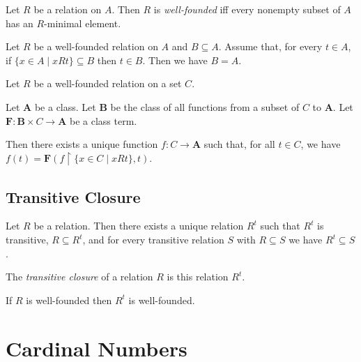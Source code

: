 \begin{definition}
    Let $R$ be a relation on $A$. Then $R$ is \emph{well-founded}
    iff every nonempty subset of $A$ has an $R$-minimal element.
\end{definition}

\begin{theorem}
    Let $R$ be a well-founded relation on $A$ and $B \subseteq A$.
    Assume that, for every $t \in A$, if $\{ x \in A \mid x Rt \} \subseteq B$
    then $t \in B$. Then we have $B = A$.
\end{theorem}

\begin{theorem}
    Let $R$ be a well-founded relation on a set $C$.

    Let $\mathbf{A}$ be a class. Let $\mathbf{B}$ be the class of all functions
    from a subset of $C$ to $\mathbf{A}$.
    Let $\mathbf{F} : \mathbf{B} \times C \rightarrow \mathbf{A}$ be a class term.

    Then there
    exists a unique function $f : C \rightarrow \mathbf{A}$ such that, for all $t \in C$,
    we have $f(t) = \mathbf{F}(f \restriction \{ x \in C \mid x R t \}, t)$.
\end{theorem}
\section{Transitive Closure}

\begin{theorem}
    Let $R$ be a relation. Then there exists a unique relation
    $R^t$ such that $R^t$ is transitive, $R \subseteq R^t$,
    and for every transitive relation $S$ with $R \subseteq S$
    we have $R^t \subseteq S$.
\end{theorem}

\begin{definition}
    The \emph{transitive closure} of a relation $R$ is this relation $R^t$.
\end{definition}

\begin{theorem}
    If $R$ is well-founded then $R^t$ is well-founded.
\end{theorem}

\chapter{Cardinal Numbers}

